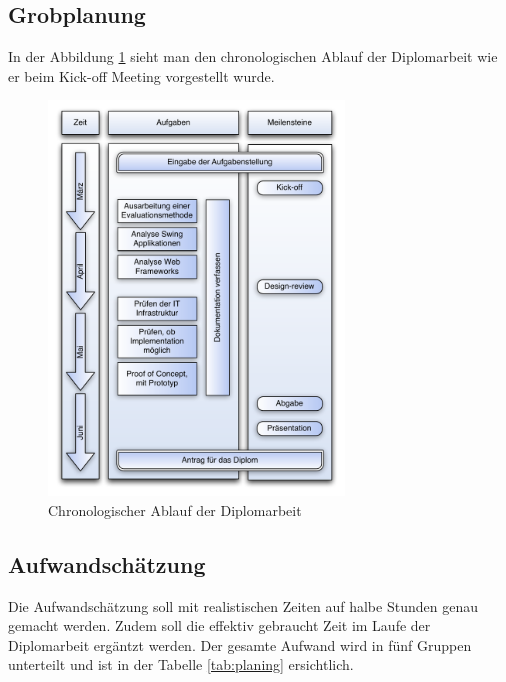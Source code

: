   \subsection{Grobplanung}
  
  In der Abbildung \ref{img:grobplanung} sieht man den chronologischen Ablauf
  der Diplomarbeit wie er beim Kick-off Meeting vorgestellt wurde.
  
  \begin{figure}[ht]
    \begin{center}
      \includegraphics[width=0.7\textwidth]{./image/grobplanung.pdf}
      \caption{Chronologischer Ablauf der Diplomarbeit}
      \label{img:grobplanung}
    \end{center}
  \end{figure}
  
  \subsection{Aufwandschätzung}
  
  Die Aufwandschätzung soll mit realistischen Zeiten auf halbe Stunden
  genau gemacht werden. Zudem soll die effektiv gebraucht Zeit im Laufe der
  Diplomarbeit ergäntzt werden. Der gesamte Aufwand wird in fünf Gruppen
  unterteilt und ist in der Tabelle \ref{tab:planing} ersichtlich.
  \newline
  
